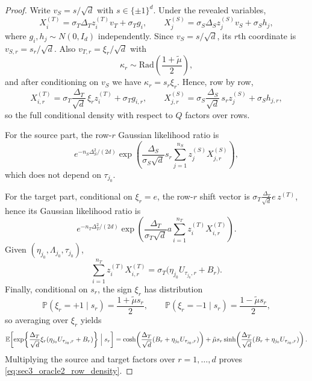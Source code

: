 \documentclass[10pt]{article}
\newcommand{\Pbb}{\mathbb P}
\newcommand{\Ebb}{\mathbb E}
\newcommand{\trg}{T}
\newcommand{\nT}{n_{\trg}}
\newcommand{\sigmaT}{\sigma_{\trg}}
\newcommand{\Xtar}{X^{(\trg)}}
\newcommand{\ztar}{z^{(\trg)}}
\newcommand{\DeltaT}{\Delta_{\trg}}
\newcommand{\src}{S}
\newcommand{\nS}{n_{\src}}
\newcommand{\sigmaS}{\sigma_{\src}}
\newcommand{\Xsrc}{X^{(\src)}}
\newcommand{\zsrc}{z^{(\src)}}
\newcommand{\DeltaS}{\Delta_{\src}}
\begin{document}
\begin{proof}
Write $v_{\src}=s/\sqrt d$ with $s\in\{\pm1\}^d$. Under the revealed variables,
\[
    \Xtar_i
    =
    \sigmaT\DeltaT \ztar_i v_{\trg}+\sigmaT g_i,
    \qquad
    \Xsrc_j
    =
    \sigmaS\DeltaS \zsrc_j v_{\src}+\sigmaS h_j,
\]
where $g_i,h_j\sim N(0,I_d)$ independently. Since $v_{\src}=s/\sqrt d$, its
$r$th coordinate is $v_{\src,r}=s_r/\sqrt d$. Also $v_{\trg,r}=\xi_r/\sqrt d$
with
\[
    \kappa_r\sim\mathrm{Rad}\!\left(\frac{1+\tilde\mu}{2}\right),
\]
and after conditioning on $v_{\src}$ we have $\kappa_r=s_r\xi_r$.
Hence, row by row,
\[
    X^{(T)}_{i,r}
    =
    \sigmaT\frac{\DeltaT}{\sqrt d}\,\xi_r \ztar_i + \sigmaT g_{i,r},
    \qquad
    X^{(S)}_{j,r}
    =
    \sigmaS\frac{\DeltaS}{\sqrt d}\, s_r \zsrc_j+\sigmaS h_{j,r},
\]
so the full conditional density with respect to $Q$ factors over rows.

For the source part, the row-$r$ Gaussian likelihood ratio is
\[
    e^{-\nS\DeltaS^2/(2d)}
    \exp\!\left(
        \frac{\DeltaS}{\sigmaS\sqrt d}
        s_r \sum_{j=1}^{\nS}\zsrc_j X^{(S)}_{j,r}
    \right),
\]
which does not depend on $\tau_{j_0}$.

For the target part, conditional on $\xi_r=e$, the row-$r$ shift vector
is $\sigmaT\frac{\DeltaT}{\sqrt d} e\,\ztar$, hence its Gaussian likelihood ratio is
\[
    e^{-\nT\DeltaT^2/(2d)}
    \exp\!\left(
        \frac{\DeltaT}{\sigmaT\sqrt d}
        a\sum_{i=1}^{\nT}\ztar_i X^{(T)}_{i,r}
    \right).
\]
Given $(\eta_{j_0},\Lambda_{j_0},\tau_{j_0})$,
\[
    \sum_{i=1}^{\nT}\ztar_i X^{(T)}_{i,r}
    =
    \sigmaT\bigl(\eta_{j_0} U_{\tau_{j_0},r}+B_r\bigr).
\]
Finally, conditional on $s_r$, the sign $\xi_r$ has distribution
\[
    \Pbb(\xi_r=+1\mid s_r)=\frac{1+\tilde\mu s_r}{2},
    \qquad
    \Pbb(\xi_r=-1\mid s_r)=\frac{1-\tilde\mu s_r}{2},
\]
so averaging over $\xi_r$ yields
\[
    \Ebb\!\left[
        \exp\!\left\{
            \frac{\DeltaT}{\sqrt d}\xi_r(\eta_{j_0} U_{\tau_{j_0},r}+B_r)
        \right\}
        \Bigm| s_r
    \right]
    =
    \cosh\!\left(
        \frac{\DeltaT}{\sqrt d}(B_r+\eta_{j_0} U_{\tau_{j_0},r})
    \right)
    +
    \tilde\mu s_r \sinh\!\left(
        \frac{\DeltaT}{\sqrt d}(B_r+\eta_{j_0} U_{\tau_{j_0},r})
    \right).
\]
Multiplying the source and target factors over $r=1,\ldots,d$ proves
\eqref{eq:sec3_oracle2_row_density}.
\end{proof}
\end{document}
